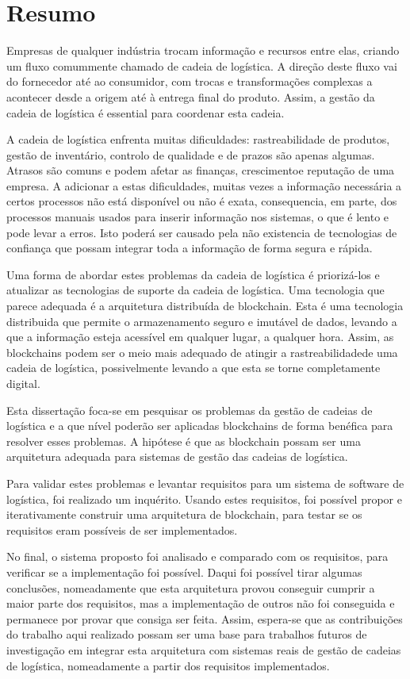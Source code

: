 \chapter{Resumo}
Empresas de qualquer indústria trocam informação e recursos entre elas, criando um fluxo comummente chamado de cadeia de logística. A direção deste fluxo vai do fornecedor até ao consumidor, com trocas e transformações complexas a acontecer desde a origem até à entrega final do produto. Assim, a gestão da cadeia de logística é essential para coordenar esta cadeia.

A cadeia de logística enfrenta muitas dificuldades: rastreabilidade de produtos, gestão de inventário, controlo de qualidade e de prazos são apenas algumas. Atrasos são comuns e podem afetar as finanças, crescimentoe reputação de uma empresa. A adicionar a estas dificuldades, muitas vezes a informação necessária a certos processos não está disponível ou não é exata, consequencia, em parte, dos processos manuais usados para inserir informação nos sistemas, o que é lento e pode levar a erros. Isto poderá ser causado pela não existencia de tecnologias de confiança que possam integrar toda a informação de forma segura e rápida.

Uma forma de abordar estes problemas da cadeia de logística é priorizá-los e atualizar as tecnologias de suporte da cadeia de logística. Uma tecnologia que parece adequada é a arquitetura distribuída de blockchain. Esta é uma tecnologia distribuida que permite o armazenamento seguro e imutável de dados, levando a que a informação esteja acessível em qualquer lugar, a qualquer hora. Assim, as blockchains podem ser o meio mais adequado de atingir a rastreabilidadede uma cadeia de logística, possivelmente levando a que esta se torne completamente digital.

Esta dissertação foca-se em pesquisar os problemas da gestão de cadeias de logística e a que nível poderão ser aplicadas blockchains de forma benéfica para resolver esses problemas. A hipótese é que as blockchain possam ser uma arquitetura adequada para sistemas de gestão das cadeias de logística.

Para validar estes problemas e levantar requisitos para um sistema de software de logística, foi realizado um inquérito. Usando estes requisitos, foi possível propor e iterativamente construir uma arquitetura de blockchain, para testar se os requisitos eram possíveis de ser implementados.

No final, o sistema proposto foi analisado e comparado com os requisitos, para verificar se a implementação foi possível. Daqui foi possível tirar algumas conclusões, nomeadamente que esta arquitetura provou conseguir cumprir a maior parte dos requisitos, mas a implementação de outros não foi conseguida e permanece por provar que consiga ser feita. Assim, espera-se que as contribuições do trabalho aqui realizado possam ser uma base para trabalhos futuros de investigação em integrar esta arquitetura com sistemas reais de gestão de cadeias de logística, nomeadamente a partir dos requisitos implementados.





